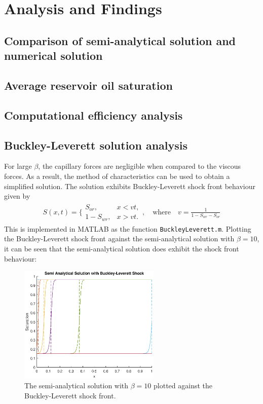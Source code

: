 \documentclass[11pt]{article}
\begin{document}
\smallbreak
\section{Analysis and Findings}
\subsection{Comparison of semi-analytical solution and numerical solution}

\subsection{Average reservoir oil saturation}


\subsection{Computational efficiency analysis}

\subsection{Buckley-Leverett solution analysis}
For large $\beta$, the capillary forces are negligible when compared to the viscous forces. As a result, the method of characteristics can be used to obtain a simplified solution. The solution exhibits Buckley-Leverett shock front behaviour given by
\begin{eqnarray}
S(x,t) = \bigg\{
\begin{array}{lr}
S_{or}, &x<vt,\\
1-S_{wr}, &x>vt.
\end{array},\quad\text{where} \quad v = \frac{1}{1-S_{wr}-S_{or}}
\end{eqnarray}
This is implemented in MATLAB as the function \verb|BuckleyLeverett.m|. Plotting the Buckley-Leverett shock front against the semi-analytical solution with $\beta=10$, it can be seen that the semi-analytical solution does exhibit the shock front behaviour:

\begin{figure}[!h]
\centering
\includegraphics[width = 0.6\textwidth]{semianalytical-buckleyleverett.eps}
\caption{The semi-analytical solution with $\beta=10$ plotted against the Buckley-Leverett shock front.}
\end{figure}
\end{document}
